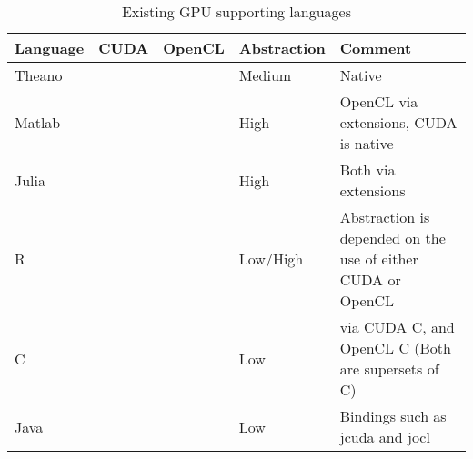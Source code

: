 \begin{table}
	\centering
	\begin{tabular}{|l|c|c|l|l|}
	\hline
	\textbf{Language} & \textbf{CUDA}         & \textbf{OpenCL} & \textbf{Abstraction} & \textbf{Comment}			  		\\ \hline
	Theano   & \cmark           & \cmark            & Medium      &  Native                                                          \\ \hline
	Matlab   & \cmark           & \cmark            & High        &  OpenCL via extensions, CUDA is native                                                         \\ \hline
	Julia    & \cmark           & \cmark              & High        &  Both via extensions                                                          \\ \hline
	R        & \cmark           & \cmark            & Low/High    & Abstraction is depended on the use of either CUDA or OpenCL \\ \hline
	C   & \cmark           & \cmark            & Low         & via CUDA C, and OpenCL C (Both are supersets of C)                                           \\ \hline
	Java     & \cmark           & \cmark              &   Low          & Bindings such as jcuda and jocl                                            \\ \hline
	\end{tabular}
	\caption{Existing GPU supporting languages}
	\label{tbl:sota}
\end{table}
               
